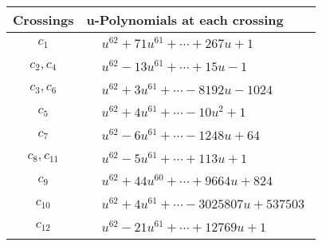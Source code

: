 \documentclass[1p]{elsarticle_modified}
\theoremstyle{definition}
\begin{document}
\begin{tabular}{m{50pt}|m{274pt}}
Crossings & \hspace{64pt}u-Polynomials at each crossing \\
\hline $$\begin{aligned}c_{1}\end{aligned}$$&$\begin{aligned}
&u^{62}+71 u^{61}+\cdots+267 u+1
\end{aligned}$\\
\hline $$\begin{aligned}c_{2},c_{4}\end{aligned}$$&$\begin{aligned}
&u^{62}-13 u^{61}+\cdots+15 u-1
\end{aligned}$\\
\hline $$\begin{aligned}c_{3},c_{6}\end{aligned}$$&$\begin{aligned}
&u^{62}+3 u^{61}+\cdots-8192 u-1024
\end{aligned}$\\
\hline $$\begin{aligned}c_{5}\end{aligned}$$&$\begin{aligned}
&u^{62}+4 u^{61}+\cdots-10 u^2+1
\end{aligned}$\\
\hline $$\begin{aligned}c_{7}\end{aligned}$$&$\begin{aligned}
&u^{62}-6 u^{61}+\cdots-1248 u+64
\end{aligned}$\\
\hline $$\begin{aligned}c_{8},c_{11}\end{aligned}$$&$\begin{aligned}
&u^{62}-5 u^{61}+\cdots+113 u+1
\end{aligned}$\\
\hline $$\begin{aligned}c_{9}\end{aligned}$$&$\begin{aligned}
&u^{62}+44 u^{60}+\cdots+9664 u+824
\end{aligned}$\\
\hline $$\begin{aligned}c_{10}\end{aligned}$$&$\begin{aligned}
&u^{62}+4 u^{61}+\cdots-3025807 u+537503
\end{aligned}$\\
\hline $$\begin{aligned}c_{12}\end{aligned}$$&$\begin{aligned}
&u^{62}-21 u^{61}+\cdots+12769 u+1
\end{aligned}$\\
\hline
\end{tabular}\\~\\
\end{document}
